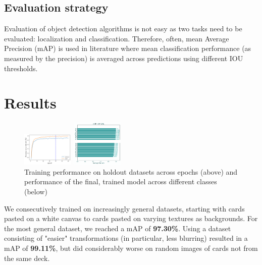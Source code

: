 \documentclass[a0,landscape]{a0poster}
\begin{document}
\begin{multicols}{3}
\subsection*{Evaluation strategy}
Evaluation of object detection algorithms is not easy as two tasks need to be evaluated: localization and classification.
Therefore, often, mean Average Precision (mAP) is used in literature where mean classification performance (as measured by the precision) is averaged across predictions using different IOU thresholds.




\section*{Results}
\begin{figure}

    \includegraphics[width=0.22\textwidth]{traindev}



    \includegraphics[width=0.22\textwidth]{mAP}

  \caption{Training performance on holdout datasets across epochs (above) and performance of the final, trained model across different classes (below)}
\end{figure}

We consecutively trained on increasingly general datasets, starting with cards pasted on a white canvas to cards pasted on varying textures as backgrounds.
For the most general dataset, we reached a mAP of \textbf{97.30\%}. Using a dataset consisting of "easier" transformations (in particular, less blurring) resulted in a mAP of \textbf{99.11\%}, but did considerably worse on random images of cards not from the same deck.






\end{multicols}
\end{document}
